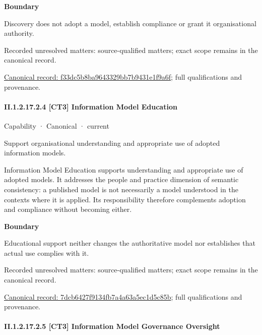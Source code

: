 \textbf{Boundary}



Discovery does not adopt a model, establish compliance or grant it organisational authority.


{\small Recorded unresolved matters: source-qualified matters; exact scope remains in the canonical record.}\par
{\footnotesize \href{../../../../../../../continuum/strategy/capability/f33dc5b8ba9643329bb7b9431e1f9a6f.md}{Canonical record: f33dc5b8ba9643329bb7b9431e1f9a6f}; full qualifications and provenance.}\par
\paragraph*{II.1.2.17.2.4 [CT3] Information Model Education}
\label{navigation:II.1.2.17.2.4}

\label{element:7dcb6427f9134fb7a4a63a5ec1d5c85b}
{\small Capability · Canonical · current}\par

Support organisational understanding and appropriate use of adopted information models.



Information Model Education supports understanding and appropriate use of adopted models. It addresses the people and practice dimension of semantic consistency: a published model is not necessarily a model understood in the contexts where it is applied. Its responsibility therefore complements adoption and compliance without becoming either.



\textbf{Boundary}



Educational support neither changes the authoritative model nor establishes that actual use complies with it.


{\small Recorded unresolved matters: source-qualified matters; exact scope remains in the canonical record.}\par
{\footnotesize \href{../../../../../../../continuum/strategy/capability/7dcb6427f9134fb7a4a63a5ec1d5c85b.md}{Canonical record: 7dcb6427f9134fb7a4a63a5ec1d5c85b}; full qualifications and provenance.}\par
\paragraph*{II.1.2.17.2.5 [CT3] Information Model Governance Oversight}
\label{navigation:II.1.2.17.2.5}

